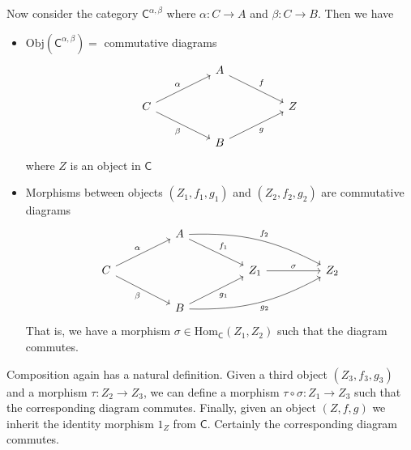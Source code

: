 \documentclass[../../master.tex]{subfiles}
\begin{document}
\begin{solution}
      Now consider the category \(\mathsf{C}^{\alpha, \beta}\) where \(\alpha: C \to A\) and \(\beta: C \to B\). Then we have
      \begin{itemize}
        \item \(\text{Obj}(\mathsf{C}^{\alpha, \beta}) = \) commutative diagrams
        \[
        \begin{tikzcd}
	        && {A} \\
	        {C} &&&& {Z} \\
	        && {B}
	        \arrow["{\alpha}", from=2-1, to=1-3]
	        \arrow["{\beta}"', from=2-1, to=3-3]
	        \arrow["{f}", from=1-3, to=2-5]
	        \arrow["{g}"', from=3-3, to=2-5]
        \end{tikzcd}
        \]
        where \(Z\) is an object in \(\mathsf{C}\)
        \item Morphisms between objects \((Z_{1}, f_{1}, g_{1})\) and \((Z_{2}, f_{2}, g_{2})\) are commutative diagrams
        \[
        \begin{tikzcd}
	        && {A} \\
	        {C} &&&& {Z_{1}} && {Z_{2}} \\
	        && {B}
	        \arrow["{\alpha}", from=2-1, to=1-3]
	        \arrow["{\beta}"', from=2-1, to=3-3]
	        \arrow["{f_{1}}", from=1-3, to=2-5]
	        \arrow["{g_{1}}"', from=3-3, to=2-5]
	        \arrow["{f_{2}}", from=1-3, to=2-7, bend left=15]
	        \arrow["{g_{2}}"', from=3-3, to=2-7, bend right=15]
	        \arrow["{\sigma}", from=2-5, to=2-7]
        \end{tikzcd}
        \]
        That is, we have a morphism \(\sigma \in \text{Hom}_{\mathsf{C}}(Z_{1}, Z_{2})\) such that the diagram commutes.
      \end{itemize}
      Composition again has a natural definition. Given a third object \((Z_{3}, f_{3}, g_{3})\) and a morphism \(\tau: Z_{2} \to Z_{3}\),
      we can define a morphism \(\tau \circ \sigma: Z_{1} \to Z_{3}\) such that the corresponding diagram commutes.
      Finally, given an object \((Z, f, g)\) we inherit the identity morphism \(1_{Z}\) from \(\mathsf{C}\).
      Certainly the corresponding diagram commutes.
    \end{solution}
\end{document}
